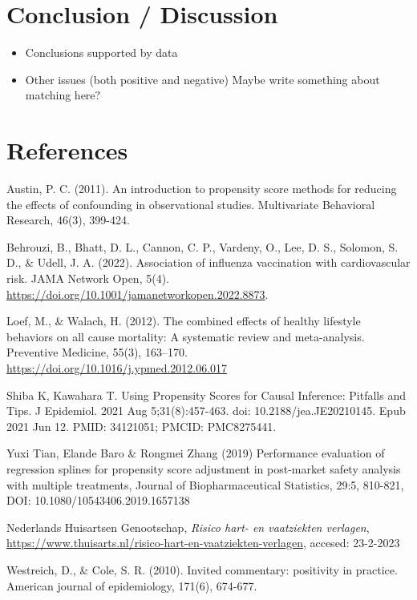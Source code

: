 \documentclass[
]{article}
\begin{document}
\hypertarget{conclusion-discussion}{%
\section{Conclusion / Discussion}\label{conclusion-discussion}}

\begin{itemize}
\item
  Conclusions supported by data
\item
  Other issues (both positive and negative) Maybe write something about matching here?
\end{itemize}

\hypertarget{references}{%
\section{References}\label{references}}

Austin, P. C. (2011). An introduction to propensity score methods for reducing the effects of confounding in observational studies. Multivariate Behavioral Research, 46(3), 399-424.

Behrouzi, B., Bhatt, D. L., Cannon, C. P., Vardeny, O., Lee, D. S., Solomon, S. D., \& Udell, J. A. (2022). Association of influenza vaccination with cardiovascular risk. JAMA Network Open, 5(4). \url{https://doi.org/10.1001/jamanetworkopen.2022.8873}.

Loef, M., \& Walach, H. (2012). The combined effects of healthy lifestyle behaviors on all cause mortality: A systematic review and meta-analysis. Preventive Medicine, 55(3), 163--170. \url{https://doi.org/10.1016/j.ypmed.2012.06.017}

Shiba K, Kawahara T. Using Propensity Scores for Causal Inference: Pitfalls and Tips. J Epidemiol. 2021 Aug 5;31(8):457-463. doi: 10.2188/jea.JE20210145. Epub 2021 Jun 12. PMID: 34121051; PMCID: PMC8275441.

Yuxi Tian, Elande Baro \& Rongmei Zhang (2019) Performance evaluation of regression splines for propensity score adjustment in post-market safety analysis with multiple treatments, Journal of Biopharmaceutical Statistics, 29:5, 810-821, DOI: 10.1080/10543406.2019.1657138

Nederlands Huisartsen Genootschap, \emph{Risico hart- en vaatziekten verlagen}, \url{https://www.thuisarts.nl/risico-hart-en-vaatziekten-verlagen}, accesed: 23-2-2023

Westreich, D., \& Cole, S. R. (2010). Invited commentary: positivity in practice. American journal of epidemiology, 171(6), 674-677.

  
\end{document}
